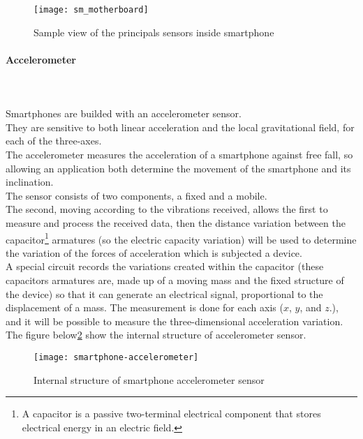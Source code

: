 \documentclass[tesi]{subfiles}
\begin{document}
\vspace{1cm}
\begin{figure}[ht]
\centering
\texttt{[image: sm\_motherboard]}
\caption{Sample view of the principals sensors inside smartphone}
\label{fig:Sample smartphone sensors}
\end{figure}


\paragraph{{\Large Accelerometer}}\leavevmode\\\\
Smartphones are builded with an accelerometer sensor.\\
They are sensitive to both linear acceleration and the local gravitational field, for each of the three-axes.\\ The accelerometer measures the acceleration of a smartphone against free fall, so allowing an application both determine the movement of the smartphone and its inclination.\\
The sensor consists of two components, a fixed and a mobile.\\
The second, moving according to the vibrations received, allows the first to measure and process the received data, then the distance variation between the capacitor\footnote{A capacitor is a passive two-terminal electrical component that stores electrical energy in an electric field.} armatures (so the electric capacity variation) will be used to determine the variation of the forces of acceleration which is subjected a device.\\ A special circuit records the variations created within the capacitor (these capacitors armatures are, made up of a moving mass and the fixed structure of the device) so that it can generate an electrical signal, proportional to the displacement of a mass.
The measurement is done for each axis ($x$, $y$, and $z$.), and it will be possible to measure the three-dimensional acceleration variation.\\The figure below\ref{fig:Sample smartphone accelerometer sensors} show the internal structure of accelerometer sensor.
\vspace{1cm}
\begin{figure}[h]
\centering
\texttt{[image: smartphone-accelerometer]}
\caption{Internal structure of smartphone accelerometer sensor}
\label{fig:Sample smartphone accelerometer sensors}
\end{figure}
\clearpage
\end{document}
